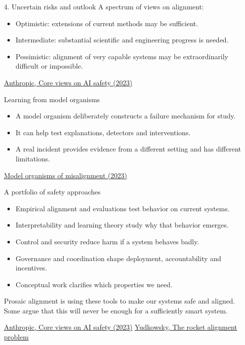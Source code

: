 \documentclass[aspectratio=169,11pt]{beamer}
\newcommand{\sources}[1]{\vfill{\fontsize{6.3}{7.5}\selectfont\color{muted}#1\par}}
\begin{document}
\begin{frame}[t,label=riskviews]{4. Uncertain risks and outlook}
A spectrum of views on alignment:
\begin{itemize}
\item Optimistic: extensions of current methods may be sufficient.
\item Intermediate: substantial scientific and engineering progress is needed.
\item Pessimistic: alignment of very capable systems may be extraordinarily difficult or impossible.
\end{itemize}
\sources{\href{https://www.anthropic.com/news/core-views-on-ai-safety}{Anthropic, Core views on AI safety (2023)}}
\end{frame}

\begin{frame}[t,label=organisms]{Learning from model organisms}
\begin{itemize}\setlength{\itemsep}{3.5mm}
\item A model organism deliberately constructs a failure mechanism for study.
\item It can help test explanations, detectors and interventions.
\item A real incident provides evidence from a different setting and has different limitations.
\end{itemize}
\sources{\href{https://www.lesswrong.com/posts/ChDH335ckdvpxXaXX/model-organisms-of-misalignment-the-case-for-a-new-pillar-of-1}{Model organisms of misalignment (2023)}}
\end{frame}

\begin{frame}[t,label=synthesis]{A portfolio of safety approaches}

\begin{itemize}
\item Empirical alignment and evaluations test behavior on current systems.
\item Interpretability and learning theory study why that behavior emerges.
\item Control and security reduce harm if a system behaves badly.
\item Governance and coordination shape deployment, accountability and incentives.
\item Conceptual work clarifies which properties we need.
\end{itemize}
Prosaic alignment is using these tools to make our systems safe and aligned. Some argue that this will never be enough for a sufficiently smart system.
\sources{\href{https://www.anthropic.com/news/core-views-on-ai-safety}{Anthropic, Core views on AI safety (2023)} \quad \href{https://www.alignmentforum.org/posts/Gg9a4y8reWKtLe3Tn/the-rocket-alignment-problem}{Yudkowsky, The rocket alignment problem}}
\end{frame}
\end{document}
